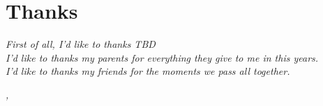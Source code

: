 \documentclass[../thesis.tex]{subfiles}
\begin{document}
    \cleardoublepage

    \bigskip

    \begingroup
    \let\clearpage\relax
    \let\cleardoublepage\relax
    \let\cleardoublepage\relax

    \chapter*{Thanks}
    \noindent \textit{First of all, I'd like to thanks TBD}\\

    \noindent \textit{I'd like to thanks my parents for everything they give to me in this years.}\\

    \noindent \textit{I'd like to thanks my friends for the moments we pass all together.}\\
    \bigskip

    \noindent\textit{\myLocation, \myTime}
    \hfill \myName

    \endgroup
\end{document}
